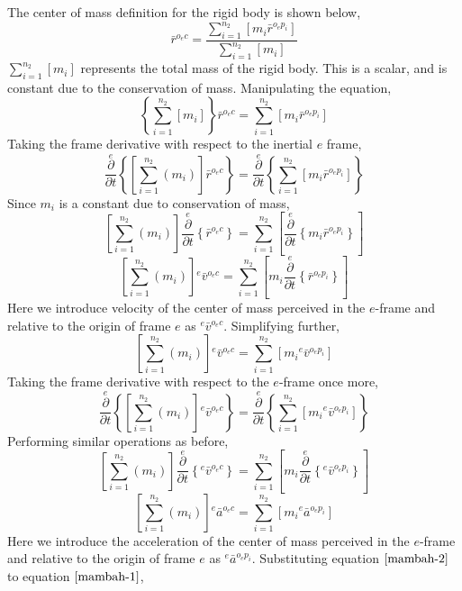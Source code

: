 \documentclass[a4paper, 12pt]{report}
\begin{document}
\begin{center}
The center of mass definition for the rigid body is shown below,
$$\bar{r}^{o_{e}c} = \frac{\displaystyle \sum^{n_{2}}_{i = 1}\left[m_{i}\bar{r}^{o_{e}p_{i}}\right]}{\displaystyle \sum^{n_{2}}_{i = 1}\left[m_{i}\right]}$$
$\displaystyle \sum^{n_{2}}_{i = 1}\left[m_{i}\right]$ represents the total mass of the rigid body. This is a scalar, and is constant due to the conservation of mass. Manipulating the equation,
$$\left\{\sum^{n_{2}}_{i = 1}\left[m_{i}\right]\right\}\bar{r}^{o_{e}c} = \sum^{n_{2}}_{i = 1}\left[m_{i}\bar{r}^{o_{e}p_{i}}\right]$$
Taking the frame derivative with respect to the inertial $e$ frame,
$$\overset{e}{\frac{\partial}{\partial t}}\left\{\left[\displaystyle \sum^{n_{2}}_{i = 1}\left(m_{i}\right)\right]\bar{r}^{o_{e}c}\right\} = \overset{e}{\frac{\partial}{\partial t}}\left\{\sum^{n_{2}}_{i = 1}\left[m_{i}\bar{r}^{o_{e}p_{i}}\right]\right\}$$
Since $m_{i}$ is a constant due to conservation of mass,
$$\left[\displaystyle \sum^{n_{2}}_{i = 1}\left(m_{i}\right)\right]\overset{e}{\frac{\partial}{\partial t}}\left\{\bar{r}^{o_{e}c}\right\} = \sum^{n_{2}}_{i = 1}\left[\overset{e}{\frac{\partial}{\partial t}}\left\{m_{i}\bar{r}^{o_{e}p_{i}}\right\}\right]$$
$$\left[\displaystyle \sum^{n_{2}}_{i = 1}\left(m_{i}\right)\right]{}^{e}\bar{v}^{o_{e}c} = \sum^{n_{2}}_{i = 1}\left[m_{i}\overset{e}{\frac{\partial}{\partial t}}\left\{\bar{r}^{o_{e}p_{i}}\right\}\right]$$
Here we introduce velocity of the center of mass perceived in the $e$-frame and relative to the origin of frame $e$ as ${}^{e}\bar{v}^{o_{e}c}$. Simplifying further,
$$\left[\sum^{n_{2}}_{i = 1}\left(m_{i}\right)\right]{}^{e}\bar{v}^{o_{e}c} = \sum^{n_{2}}_{i = 1}\left[m_{i}{}^{e}\bar{v}^{o_{e}p_{i}}\right]$$
Taking the frame derivative with respect to the $e$-frame once more,
$$\overset{e}{\frac{\partial}{\partial t}}\left\{\left[\sum^{n_{2}}_{i = 1}\left(m_{i}\right)\right]{}^{e}\bar{v}^{o_{e}c}\right\} = \overset{e}{\frac{\partial}{\partial t}}\left\{\sum^{n_{2}}_{i = 1}\left[m_{i}{}^{e}\bar{v}^{o_{e}p_{i}}\right]\right\}$$
Performing similar operations as before,
$$\left[\sum^{n_{2}}_{i = 1}\left(m_{i}\right)\right]\overset{e}{\frac{\partial}{\partial t}}\left\{{}^{e}\bar{v}^{o_{e}c}\right\} = \sum^{n_{2}}_{i = 1}\left[m_{i}\overset{e}{\frac{\partial}{\partial t}}\left\{{}^{e}\bar{v}^{o_{e}p_{i}}\right\}\right]$$
\begin{equation}\left[\sum^{n_{2}}_{i = 1}\left(m_{i}\right)\right]{}^{e}\bar{a}^{o_{e}c} = \sum^{n_{2}}_{i = 1}\left[m_{i}{}^{e}\bar{a}^{o_{e}p_{i}}\right]\label{mambah-2}\end{equation}
Here we introduce the acceleration of the center of mass perceived in the $e$-frame and relative to the origin of frame $e$ as ${}^{e}\bar{a}^{o_{e}p_{i}}$. Substituting equation $\ref{mambah-2}$ to equation $\ref{mambah-1}$,

\end{center}
\end{document}
